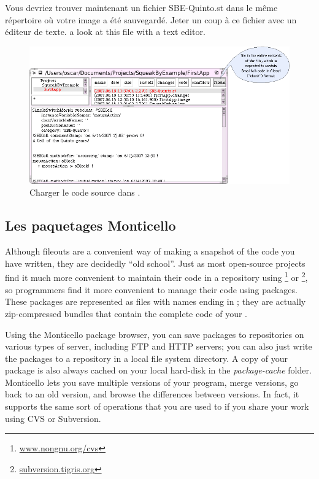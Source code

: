 \documentclass[a4paper,10pt,twoside]{book}
\begin{document}
Vous devriez trouver maintenant un fichier SBE-Quinto.st dans le même répertoire où votre image a été sauvegardé.
Jeter un coup à ce fichier avec un éditeur de texte. a look at this file with a text editor.

\begin{figure}[ht]
\centerline {\includegraphics[width=\textwidth]{FileIn}}
\caption{Charger le code source dans \squeak.
\label{fig:filein}}
\end{figure}

\subsection{Les paquetages Monticello}
Although fileouts are a convenient way of making a snapshot of the code you have written, they are decidedly ``old school''.
Just as most open-source projects find it much more convenient to maintain their code in a repository using \footnote{\url{www.nongnu.org/cvs}} or \footnote{\url{subversion.tigris.org}},
so \squeak programmers find it more convenient to manage their code using  packages. 
These packages are represented as files with names ending in ; they are actually zip-compressed bundles that contain the complete code of your .

Using the Monticello package browser, you can save packages to repositories on various types of server, including FTP and HTTP servers; you can also just write the packages to a repository in a local file system directory.
A copy of your package is also always cached on your local hard-disk in the \emph{package-cache} folder. 
Monticello lets you save multiple versions of your program, merge versions, go back to an old version, and browse the differences between versions. 
In fact, it supports the same sort of operations that you are used to if you share your work using CVS or Subversion.
\end{document}
